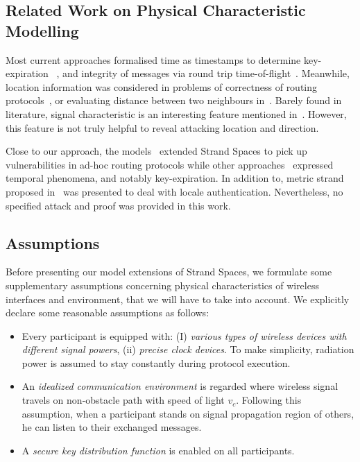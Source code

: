 \subsection{Related Work on Physical Characteristic Modelling}

Most current approaches formalised time as timestamps to determine key-expiration~\cite{Li:2007:ESS:1338438.1338469} , and integrity of messages via round trip time-of-flight~\cite{Poturalski:2008:TPS:1456396.1456400, RaphaelJamet}. Meanwhile, location information was considered in problems of correctness of routing protocols~\cite{5230621,Basin:2009:LGP:1616077.1616079}, or evaluating distance between two neighbours in~\cite{Poturalski:2008:TPS:1456396.1456400}. Barely found in literature, signal characteristic is an interesting feature mentioned in~\cite{Poturalski:2008:TPS:1456396.1456400}. However, this feature is not truly helpful to reveal attacking location and direction. 

Close to our approach, the models~\cite{Yang03modelingvulnerabilities, 4481351} extended Strand Spaces to pick up vulnerabilities in ad-hoc routing protocols while other approaches~\cite{Li:2007:ESS:1338438.1338469, Sharp:2007:TTS:2391910.2391948} expressed temporal phenomena, and notably key-expiration. In addition to, metric strand proposed in~\cite{Thayer:2010aa} was presented to deal with locale authentication. Nevertheless, no specified attack and proof was provided in this work. 

\subsection{Assumptions}\label{assumptions}

Before presenting our model extensions of Strand Spaces, we formulate some supplementary assumptions concerning physical characteristics of wireless interfaces and environment, that we will have to take into account. We explicitly declare some reasonable assumptions as follows:

\begin{itemize}
\item Every participant is equipped with: (I) \textit{various types of wireless devices with different signal powers}, (ii) \textit{precise clock devices}. To make simplicity, radiation power is assumed to stay constantly during protocol execution.
\item An \textit{idealized communication environment} is regarded where wireless signal travels on non-obstacle path with speed of light $v_c$. Following this assumption, when a participant stands on signal propagation region of others, he can listen to their exchanged messages. 
\item A \textit{secure key distribution function} is enabled on all participants. 
\end{itemize}

